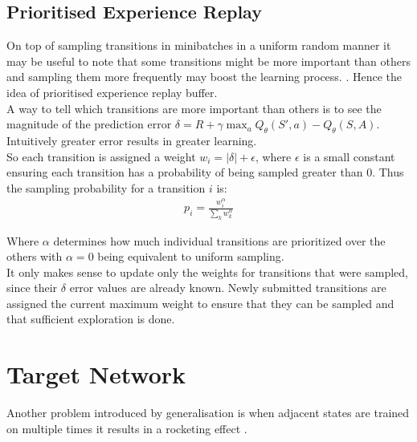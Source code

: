 \subsection{Prioritised Experience Replay}

On top of sampling transitions in minibatches in a uniform random manner it may be useful to note that some transitions might be more important than others and sampling them more frequently may boost the learning process. \cite{lecture_dqn}. Hence the idea of prioritised experience replay buffer. \\

A way to tell which transitions are more important than others is to see the magnitude of the prediction error $\delta = R + \gamma \max_a Q_{\theta}(S', a) - Q_{\theta}(S, A)$. 
Intuitively greater error results in greater learning.\\

So each transition is assigned a weight $w_i = |\delta| + \epsilon$, where $\epsilon$ is a small constant ensuring each transition has a probability of being sampled greater than 0. Thus the sampling probability for a transition $i$ is:
\begin{align}
    p_i = \frac{w_i^{\alpha}}{\sum_k w^{\alpha}_k}
\end{align}

Where $\alpha$ determines how much individual transitions are prioritized over the others with $\alpha = 0$ being equivalent to uniform sampling.\\

It only makes sense to update only the weights for transitions that were sampled, since their $\delta$ error values\cite{lecture_dqn} are already known. Newly 
submitted transitions are assigned the current maximum weight to ensure that they can be sampled and that sufficient exploration is done.


\section{Target Network }

Another problem introduced by generalisation is when adjacent states are trained on multiple times
it results in a rocketing effect \cite{lecture_dqn}.  

